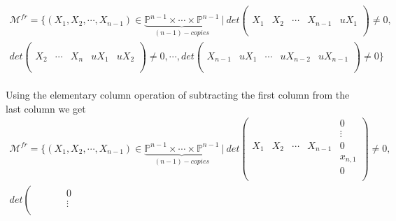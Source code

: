 \begin{example}
	\begin{align*}
		\mathcal{M}^{fr}=\{(X_1,X_2,\cdots,X_{n-1}) \in 						\underbrace{\mathbb{P}^{n-1}\times \cdots \times \mathbb{P}^{n-1}}_{(n-1)-copies}~|~		
		det
		\left( \begin{array}{c|c|c|c|c}
			& & & &\\
			& & & &\\
			X_1&X_2&\cdots&X_{n-1}&uX_1\\
			& & & &\\
			& & & &
		\end{array}\right)
		\neq 0, \\
		det
		\left( \begin{array}{c|c|c|c|c}
			& & & &\\
			& & & &\\
			X_2&\cdots & X_{n} & uX_1 & uX_2\\
			& & & &\\
			& & & &
		\end{array}\right)
		\neq 0,\cdots , det
		\left( \begin{array}{c|c|c|c|c}
			& & & &\\
			& & & &\\
			X_{n-1}&uX_1&\cdots&uX_{n-2}&uX_{n-1}\\
			& & & &\\
			& & & &
		\end{array}\right)
		\neq 0\}
	\end{align*}
\bigskip\\
Using the elementary column operation of subtracting the first column from the last column we get
\bigskip
	\begin{align*}
		\mathcal{M}^{fr}=\{(X_1,X_2,\cdots,X_{n-1}) \in 						\underbrace{\mathbb{P}^{n-1}\times \cdots \times					\mathbb{P}^{n-1}}_{(n-1)-copies}~|~		
		det 
		\left( \begin{array}{c|c|c|c|c}
			& & & &0\\
			& & & &\vdots\\
			X_1&X_2&\cdots&X_{n-1}&0\\
			& & & &x_{n,1}\\
			& & & &0\\
		\end{array}\right)
		\neq 0,\\
		det
		\left(\begin{array}{c|c|c|c|c}
			& & & &0\\
			& & & &\vdots\\

\end{array}
\end{align*}
\end{example}
